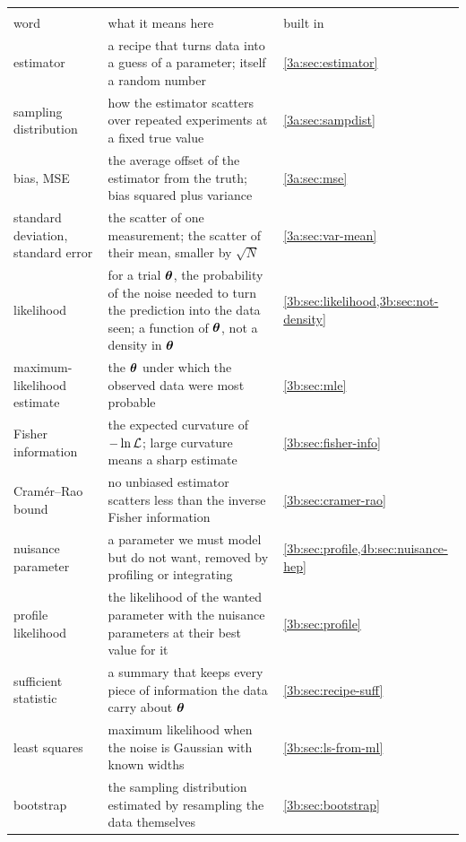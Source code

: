 \begin{center}
\small
\renewcommand{\arraystretch}{1.18}
\begin{tabularx}{\linewidth}{@{}>{\raggedright\arraybackslash}p{3.0cm}
                               >{\raggedright\arraybackslash}X
                               >{\raggedright\arraybackslash}p{2.0cm}@{}}
\toprule
\multicolumn{3}{@{}l}{\textbf{The estimate and its likelihood}}\\
word & what it means here & built in\\\midrule
estimator & a recipe that turns data into a guess of a parameter; itself a random number & \cref{3a:sec:estimator}\\
sampling distribution & how the estimator scatters over repeated experiments at a fixed true value & \cref{3a:sec:sampdist}\\
bias, MSE & the average offset of the estimator from the truth; bias squared plus variance & \cref{3a:sec:mse}\\
standard deviation, standard error & the scatter of one measurement; the scatter of their mean, smaller by $\sqrt N$ & \cref{3a:sec:var-mean}\\
likelihood & for a trial $\bm{\theta}$, the probability of the noise needed to turn the prediction into the data seen; a function of $\bm{\theta}$, not a density in $\bm{\theta}$ & \cref{3b:sec:likelihood,3b:sec:not-density}\\
maximum-likelihood estimate & the $\bm{\theta}$ under which the observed data were most probable & \cref{3b:sec:mle}\\
Fisher information & the expected curvature of $-\ln\mathcal{L}$; large curvature means a sharp estimate & \cref{3b:sec:fisher-info}\\
Cram\'er--Rao bound & no unbiased estimator scatters less than the inverse Fisher information & \cref{3b:sec:cramer-rao}\\
nuisance parameter & a parameter we must model but do not want, removed by profiling or integrating & \cref{3b:sec:profile,4b:sec:nuisance-hep}\\
profile likelihood & the likelihood of the wanted parameter with the nuisance parameters at their best value for it & \cref{3b:sec:profile}\\
sufficient statistic & a summary that keeps every piece of information the data carry about $\bm{\theta}$ & \cref{3b:sec:recipe-suff}\\
least squares & maximum likelihood when the noise is Gaussian with known widths & \cref{3b:sec:ls-from-ml}\\
bootstrap & the sampling distribution estimated by resampling the data themselves & \cref{3b:sec:bootstrap}\\
\bottomrule
\end{tabularx}
\end{center}

